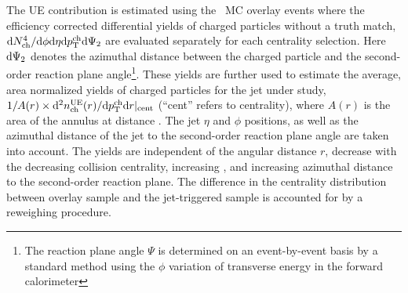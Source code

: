 The UE contribution is estimated using the \PbPb\ MC overlay events where the efficiency corrected differential yields of charged particles without a truth match, $\mathrm{d}N^{4}_{\mathrm{ch}}/\mathrm{d}\phi\mathrm{d}\eta\mathrm{d}\mbox{$p_{\mathrm{T}}^{\mathrm{ch}}$}\mathrm{d}\Psi_{2}$ are evaluated separately for
each centrality selection. Here $\mathrm{d} \Psi_{2}$ denotes the azimuthal distance between the charged particle and the second-order reaction plane angle\footnote{The reaction plane angle $\Psi$ is determined on an event-by-event basis by a standard method using the $\phi$ variation of transverse energy in the forward calorimeter}. 
These yields are further used to estimate the average, area normalized yields of charged particles for the jet under study, \mbox{$1/A(r) \times \mathrm{d}^2 \mbox{$n_{\mathrm{ch}}^{\mathrm{UE}}$}(r) / \mathrm{d} \mbox{$p_{\mathrm{T}}^{\mathrm{ch}}$} \mathrm{d} r|_{\mathrm{cent}}$} (``cent'' refers to centrality), where $A(r)$ is the area of the annulus at distance \rvar. The jet $\eta$ and $\phi$ positions, as well as the azimuthal distance of the jet to the second-order reaction plane angle are taken into account. The yields are independent of the angular distance $r$, decrease with the decreasing collision centrality, increasing \pttrk, and increasing azimuthal distance to the second-order reaction plane. The difference in the centrality distribution between overlay sample and the jet-triggered sample is accounted for by a reweighing procedure.



